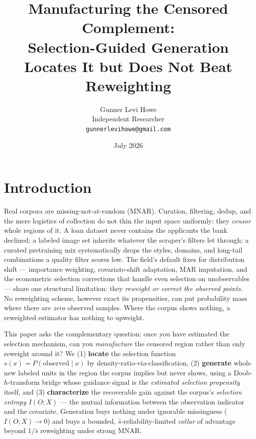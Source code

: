 \documentclass[10pt]{article}
\title{Manufacturing the Censored Complement:\\
Selection-Guided Generation Locates It but Does Not Beat Reweighting}
\author{Gunner Levi Howe\\
Independent Researcher\\
\texttt{gunnerlevihowe@gmail.com}}
\date{July 2026}
\newcommand{\shat}{\hat s}
\newcommand{\IOX}{I(O;X)}
\begin{document}
\maketitle

\begin{abstract}

\end{abstract}

\section{Introduction}
\label{sec:intro}

Real corpora are missing-not-at-random (MNAR). Curation, filtering, dedup, and
the mere logistics of collection do not thin the input space uniformly: they
\emph{censor} whole regions of it. A loan dataset never contains the applicants
the bank declined; a labeled image set inherits whatever the scraper's filters
let through; a curated pretraining mix systematically drops the styles, domains,
and long-tail combinations a quality filter scores low. The field's default
fixes for distribution shift --- importance weighting, covariate-shift
adaptation, MAR imputation, and the econometric selection corrections that
handle even selection on unobservables \citep{heckman1979,shimodaira2000,%
sugiyama2007,swaminathan2015} --- share one structural limitation: they
\emph{reweight or correct the observed points}. No reweighting scheme, however
exact its propensities, can put probability mass where there are \emph{zero}
observed samples. Where the corpus shows nothing, a reweighted estimator has
nothing to upweight.

This paper asks the complementary question: once you have estimated the
selection mechanism, can you \emph{manufacture} the censored region rather than
only reweight around it? We (1) \textbf{locate} the selection function
$s(x)=P(\text{observed}\mid x)$ by density-ratio-via-classification, (2)
\textbf{generate} whole new labeled units in the region the corpus implies but
never shows, using a Doob-$h$-transform bridge whose guidance signal is the
\emph{estimated selection propensity} itself, and (3) \textbf{characterize} the
recoverable gain against the corpus's \emph{selection entropy}
$\IOX$ --- the mutual information between the observation indicator and the
covariate. Generation buys nothing under ignorable missingness ($\IOX\!\to\!0$)
and buys a bounded, $\shat$-reliability-limited \emph{collar} of advantage
beyond $1/\shat$ reweighting under strong MNAR.
\end{document}
